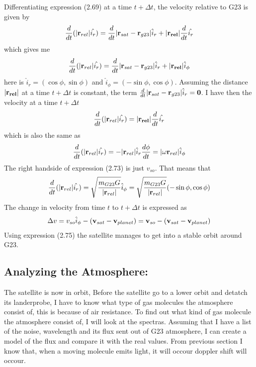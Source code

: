 \documentclass[a4paper,11pt,english]{report}
\begin{document}
Differentiating expression (2.69) at a time \(t + \Delta t\), the velocity
relative to G23 is given by
\begin{align}
  \frac{d}{dt}(|\bold{r}_{rel}|\hat{i_{r}}) = \frac{d}{dt}|\bold{r}_{sat} -
  \bold{r}_{g23}|\hat{i}_{r} + |\bold{r_{rel}}| \frac{d}{dt}\hat{i_{r}}
\end{align}
which gives me
\begin{align}
  \frac{d}{dt}(|\bold{r}_{rel}|\hat{i_{r}})  =  \frac{d}{dt}|\bold{r}_{sat} -
  \bold{r}_{g23}|\hat{i}_{r} + |\bold{r_{rel}}|\hat{i}_{\phi} 
\end{align}
here is \(\hat{i}_{r} = (\cos{\phi}, \sin{\phi})\) and \(\hat{i}_{\phi} =
(-\sin{\phi}, \cos{\phi})\). Assuming the distance \(|\bold{r_{rel}}|\) at a
time \(t+ \Delta t\) is constant, the term  \(\frac{d}{dt}|\bold{r}_{sat} -
\bold{r}_{g23}|\hat{i}_{r}= \bold{0}\). I have then the velocity at a time
\(t + \Delta t\)
\begin{align}
  \frac{d}{dt}(|\bold{r}_{rel}|\hat{i_{r}}) =  |\bold{r_{rel}}| \frac{d}{dt}\hat{i_{r}}
\end{align}
which is also the same as
\begin{align}
  \frac{d}{dt}(|\bold{r}_{rel}|\hat{i_{r}}) =
  -|\bold{r}_{rel}|\hat{i}_{r}\frac{d\phi}{dt} = |\bold{\omega} \bold{r}_{rel}|\hat{i}_{\phi}
\end{align}
The right handside of expression (2.73) is just \(v_{so}\). That means that
\begin{align}
  \frac{d}{dt}(|\bold{r}_{rel}|\hat{i_{r}}) =
  \sqrt{\frac{m_{G23}G}{|\bold{r}_{rel}|}}\hat{i}_{\phi} = \sqrt{\frac{m_{G23}G}{|\bold{r}_{rel}|}}
(-\sin{\phi},\cos{\phi})
\end{align}
The change in velocity from time \(t\) to \(t + \Delta t\) is expressed as
\begin{align}
  \Delta v = v_{so}\hat{i}_{\phi} - (\bold{v}_{sat} - \bold{v}_{planet}) =
  \bold{v}_{so}- (\bold{v}_{sat} - \bold{v}_{planet})
\end{align}
Using expression (2.75) the satellite manages to get into a stable orbit around G23.
\subsection{Analyzing the Atmosphere:}The satellite is now in orbit, Before the
satellite go to a lower orbit and  detatch its
landerprobe, I have to know what type of gas molecules the atmosphere consist of,
this is because of air resistance.
To find out what kind of gas molecule the atmosphere consist of, I will look at the
spectras. Assuming that I have a list of the noise,  wavelength and its flux sent out of
G23 atmosphere, I can create a model of the flux and compare it with the real
values. From previous section I know that, when a moving molecule emits
light, it will occour  doppler shift will occour.
\end{document}
